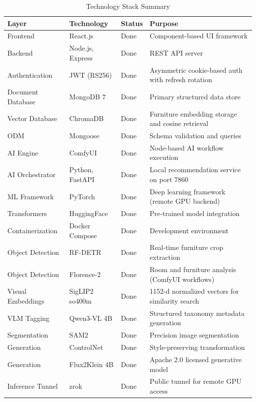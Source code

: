 \begin{table}[htbp]
    \centering
    \caption{Technology Stack Summary}
    \label{tab:tech_stack}
    \begin{tabularx}{\textwidth}{|p{3.5cm}|p{2.8cm}|p{2.2cm}|X|}
        \hline
        \textbf{Layer} & \textbf{Technology} & \textbf{Status} & \textbf{Purpose} \\
        \hline
        Frontend & React.js & Done & Component-based UI framework \\
        \hline
        Backend & Node.js, Express & Done & REST API server \\
        \hline
        Authentication & JWT (RS256) & Done & Asymmetric cookie-based auth with refresh rotation \\
        \hline
        Document Database & MongoDB 7 & Done & Primary structured data store \\
        \hline
        Vector Database & ChromaDB & Done & Furniture embedding storage and cosine retrieval \\
        \hline
        ODM & Mongoose & Done & Schema validation and queries \\
        \hline
        AI Engine & ComfyUI & Done & Node-based AI workflow execution \\
        \hline
        AI Orchestrator & Python, FastAPI & Done & Local recommendation service on port 7860 \\
        \hline
        ML Framework & PyTorch & Done & Deep learning framework (remote GPU backend) \\
        \hline
        Transformers & HuggingFace & Done & Pre-trained model integration \\
        \hline
        Containerization & Docker Compose & Done & Development environment \\
        \hline
        Object Detection & RF-DETR & Done & Real-time furniture crop extraction \\
        \hline
        Object Detection & Florence-2 & Done & Room and furniture analysis (ComfyUI workflows) \\
        \hline
        Visual Embeddings & SigLIP2 so400m & Done & 1152-d normalized vectors for similarity search \\
        \hline
        VLM Tagging & Qwen3-VL 4B & Done & Structured taxonomy metadata generation \\
        \hline
        Segmentation & SAM2 & Done & Precision image segmentation \\
        \hline
        Generation & ControlNet & Done & Style-preserving transformation \\
        \hline
        Generation & Flux2Klein 4B & Done & Apache 2.0 licensed generative model \\
        \hline
        Inference Tunnel & zrok & Done & Public tunnel for remote GPU access \\
        \hline

    \end{tabularx}
\end{table}

